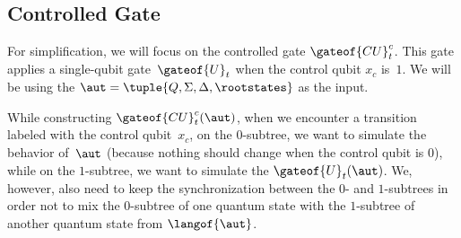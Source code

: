 \newcommand{\algControlUniversalGate}{
\begin{algorithm}[t]
\caption{Application of a~controlled gate on an \lsta}
\label{alg:MultiControlGate}
\KwIn{An \lsta $\aut=\tuple{Q,\Sigma,\Delta,\rootstates}$, a single-qubit gate
  $\gateof{U}_t=\big(\begin{smallmatrix}u_1 & u_2 \\ u_3 & u_4
  \end{smallmatrix}\big)$, a~control qubit~$x_c$}
\KwOut{$\gateof{CU}^c_t(\aut)$}
Build $\gateof{U}_t(\aut)=\tuple{Q^{\gateof U}, \Sigma^{\gateof U},
  \Delta^{\gateof U}, \rootstates}$ using
  \cref{algo:u_gate_single}, with $Q^\gateof{U}=Q\cup(Q\times Q\times \{L,R\})$\;
Build $\aut'=\tuple{Q',\Sigma,\Delta',\rootstates'}$, a primed copy of $\aut$\;

\ForEach{$\delta = \ctranstreenoset {q} {x_c} {q_1,q_2}{C} \in
  \ctr{\Delta^\gateof{U}}{\ell^U_{> t}}$\label{ln:foreach_start}}{
  \lIf(\tcp*[f]{case $c<t$}){$q_1\in Q$}{replace $\delta$ with $\ctranstreenoset {q} {x_c} {q'_1,q_2}{C}$ in $\Delta^{\gateof U}$}
  \lElseIf{$q_1=(q_a,q_b,L)$}{
    replace $\delta$ with $\ctranstreenoset {q} {x_c} {q'_a,q_2}{C}$ in $\Delta^{\gateof U}$
  }
  \lElseIf{$q_1=(q_a,q_b,R)$}{
    replace $\delta$ with $\ctranstreenoset {q} {x_c} {q'_b,q_2}{C}$ in $\Delta^{\gateof U}$
  }\label{ln:foreach_end}
}
\Return{$\tuple{Q^U\cup Q',\Sigma^U\cup\Sigma,\Delta^U\cup \Delta',\rootstates}$}
\end{algorithm}
}


\vspace{-0.0mm}
\subsection{Controlled Gate}
\vspace{-0.0mm}

For simplification, we will focus on the controlled gate $\gateof{CU}^c_t$.
This gate applies a single-qubit gate~$\gateof{U}_t$ when the control qubit $x_c$ is~$1$.
We will be using the \lsta $\aut = \tuple{Q,
\Sigma, \Delta, \rootstates}$ as the input.

While constructing $\gateof{CU}^c_t(\aut)$, when we encounter a transition labeled with the control
qubit~$x_c$, on the $0$-subtree, we want to simulate the behavior of~$\aut$ (because nothing
should change when the control qubit is $0$), while on the $1$-subtree, we want
to simulate the \lsta $\gateof{U}_t(\aut)$.
We, however, also need to keep the synchronization between the $0$- and
$1$-subtrees in order not to mix the $0$-subtree of one quantum state with the
$1$-subtree of another quantum state from $\langof{\aut}$.

